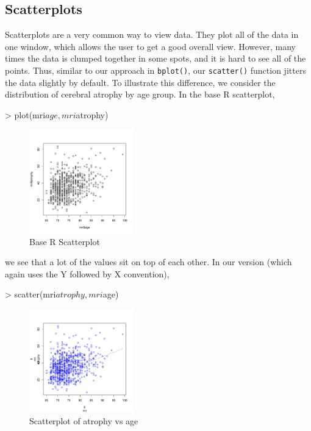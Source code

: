 \documentclass[landscape]{article}
\renewenvironment{Schunk}{\vspace{\topsep}}{\vspace{\topsep}}
\begin{document}
\subsection{Scatterplots}
Scatterplots are a very common way to view data. They plot all of the data in one window, which allows the user to get a good overall view. However, many times the data is clumped together in some spots, and it is hard to see all of the points. Thus, similar to our approach in \texttt{bplot()}, our \texttt{scatter()} function jitters the data slightly by default. To illustrate this difference, we consider the distribution of cerebral atrophy by age group. In the base R scatterplot,
\begin{Schunk}
\begin{Sinput}
> plot(mri$age, mri$atrophy)
\end{Sinput}
\end{Schunk}
\begin{figure}[ht]
\begin{center}
\includegraphics[width=0.4\textwidth]{test_cases-plot}
\caption{Base R Scatterplot}
\label{baseR}
\end{center}
\end{figure}
\FloatBarrier
we see that a lot of the values sit on top of each other. In our version (which again uses the Y followed by X convention),
\begin{Schunk}
\begin{Sinput}
> scatter(mri$atrophy, mri$age)
\end{Sinput}
\end{Schunk}
\begin{figure}[ht]
\begin{center}
\includegraphics[keepaspectratio = true, width=0.4\textwidth]{test_cases-agescatter}
\caption{Scatterplot of atrophy vs age}
\label{agescatter}
\end{center}
\end{figure}
\end{document}
